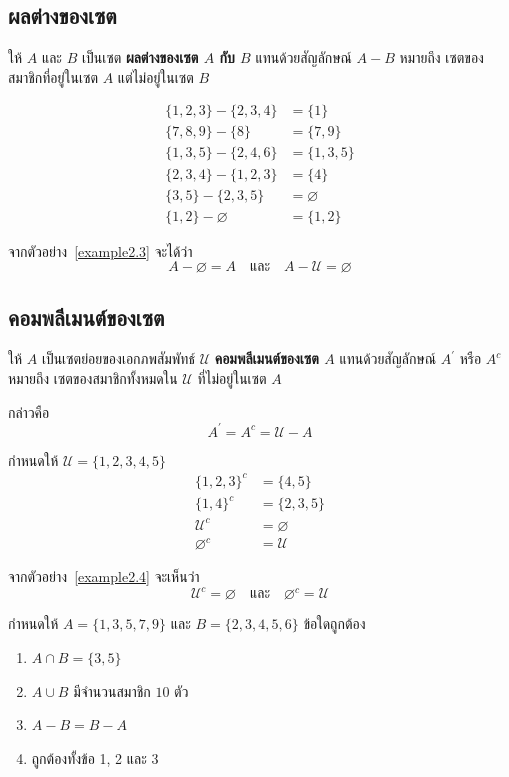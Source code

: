 \subsection{ผลต่างของเซต}
\noindent
ให้ $A$ และ $B$ เป็นเซต  
\textbf{ผลต่างของเซต $A$ กับ $B$} แทนด้วยสัญลักษณ์ $A-B$  
หมายถึง เซตของสมาชิกที่อยู่ในเซต $A$ แต่ไม่อยู่ในเซต $B$

\begin{examplebox}\label{example2.3}
\begin{align*}
\{1,2,3\}-\{2,3,4\} &= \{1\}\\  
\{7,8,9\}-\{8\} &= \{7,9\} \\
\{1,3,5\}-\{2,4,6\} &= \{1,3,5\}\\
\{2,3,4\}-\{1,2,3\} &= \{4\} \\
\{3,5\}-\{2,3,5\} &= \varnothing \\
\{1,2\}-\varnothing &= \{1,2\}
\end{align*}
\end{examplebox}

จากตัวอย่าง~\ref{example2.3} จะได้ว่า  
\[
A-\varnothing = A 
\quad \text{และ} \quad 
A-\mathcal{U} = \varnothing
\]

\newpage
\subsection{คอมพลีเมนต์ของเซต}
\noindent
ให้ $A$ เป็นเซตย่อยของเอกภพสัมพัทธ์ $\mathcal{U}$  
\textbf{คอมพลีเมนต์ของเซต $A$} แทนด้วยสัญลักษณ์ $A^{\prime}$ หรือ $A^c$  
หมายถึง เซตของสมาชิกทั้งหมดใน $\mathcal{U}$ ที่ไม่อยู่ในเซต $A$

กล่าวคือ
\[
A^{\prime} = A^c = \mathcal{U}-A
\]

\begin{examplebox}\label{example2.4}
กำหนดให้ $\mathcal{U}=\{1,2,3,4,5\}$
\begin{align*}
\{1,2,3\}^c &= \{4,5\}\\  
\{1,4\}^c &= \{2,3,5\}\\ 
\mathcal{U}^c &= \varnothing\\ 
\varnothing^c &= \mathcal{U}
\end{align*}
\end{examplebox}

จากตัวอย่าง~\ref{example2.4} จะเห็นว่า  
\[
\mathcal{U}^c=\varnothing 
\quad \text{และ} \quad 
\varnothing^c=\mathcal{U}
\]

\newpage
\begin{examplebox}
กำหนดให้ $A=\{1,3,5,7,9\}$ และ $B=\{2,3,4,5,6\}$  
ข้อใดถูกต้อง
\begin{enumerate}
\item $A \cap B=\{3,5\}$
\item $A \cup B$ มีจำนวนสมาชิก $10$ ตัว
\item $A-B=B-A$
\item ถูกต้องทั้งข้อ 1, 2 และ 3
\end{enumerate}
\end{examplebox}

